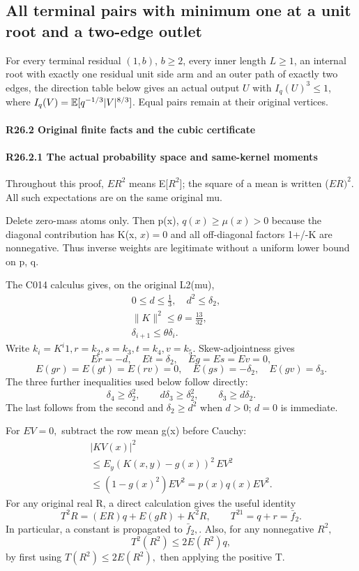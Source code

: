 \subsection{All terminal pairs with minimum one at a unit root and a two-edge outlet}\label{proof:R2-C026}
For every terminal residual $(1,b)$, $b\ge2$, every inner length $L\ge1$, an internal root with exactly one residual unit side arm and an outer path of exactly two edges, the direction table below gives an actual output $U$ with $I_q(U)^3\le1$, where $I_q(V)=\mathbb E[q^{-1/3}|V|^{8/3}]$. Equal pairs remain at their original vertices.

\paragraph{R26.2 Original finite facts and the cubic certificate}

\paragraph{R26.2.1 The actual probability space and same-kernel moments}

Throughout this proof, \(ER^2\) means E[\(R^2\)]; the square of a mean is
written (\(ER)^2.\) All such expectations are on the same original mu.

Delete zero-mass atoms only. Then p(x), \(q(x)\ge \mu(x)>0\) because the diagonal
contribution has K(x, \(x)=0\) and all off-diagonal factors 1+/-K are nonnegative.
Thus inverse weights are legitimate without a uniform lower bound on p, q.

The C014 calculus gives, on the original L2(mu),
\[
\begin{gathered}
0\le d\le\tfrac13,\quad d^2\le \delta_2,\quad\\
\|K\|^2\le\theta=\tfrac{13}{32},\quad\\
\delta_{i+1}\le\theta \delta_i.
\end{gathered}
\]
Write \(k_i=K^i1,\allowbreak  r=k_2,\allowbreak  s=k_3,\allowbreak  t=k_4,\allowbreak  v=k_5.\)
Skew-adjointness gives
\[
Er=-d,\quad Et=\delta_2,\quad Eg=Es=Ev=0,
\]
\[
E(gr)=E(gt)=E(rv)=0,\quad E(gs)=-\delta_2,\quad E(gv)=\delta_3.
\]
The three further inequalities used below follow directly:
\[
\delta_4\ge \delta_2^2,\qquad d\delta_3\ge \delta_2^2,\qquad \delta_3\ge d\delta_2.
\]
The last follows from the second and \(\delta_2\ge d^2\) when \(d>0\); \(d=0\) is immediate.

For \(EV=0,\allowbreak \) subtract the row mean g(x) before Cauchy:
\[
\begin{gathered}
|KV(x)|^2\\
\le E_y(K(x,y)-g(x))^2\,EV^2\\
\le(1-g(x)^2)EV^2=p(x)q(x)EV^2.
\end{gathered}\tag{R26.A.1}
\]
For any original real R, a direct calculation gives the useful identity
\[
T^2R=(ER)q+E(gR)+K^2R,\qquad T^21=q+r=\bar f_2.     \tag{R26.A.2}
\]
In particular, a constant is propagated to \(\bar f_2,\allowbreak \). Also, for any
nonnegative \(R^2,\allowbreak \)
\[
T^2(R^2)\le 2E(R^2)q,                            \tag{R26.A.3}
\]
by first using \(T(R^2)\le 2E(R^2),\allowbreak \) then applying the positive T.

